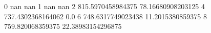 0 nan nan
1 nan nan
2 815.5970458984375 78.16680908203125
4 737.4302368164062 0.0
6 748.6317749023438 11.2015380859375
8 759.820068359375 22.38983154296875
